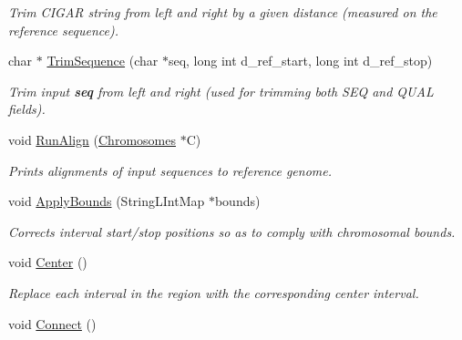 \begin{CompactItemize}
\begin{CompactList}\small\item\em Trim CIGAR string from left and right by a given distance (measured on the reference sequence). \item\end{CompactList}\item 
\hypertarget{classGenomicRegionSAM_0ff4472118291a8034efc929c784680c}{
char $\ast$ \hyperlink{classGenomicRegionSAM_0ff4472118291a8034efc929c784680c}{TrimSequence} (char $\ast$seq, long int d\_\-ref\_\-start, long int d\_\-ref\_\-stop)}
\label{classGenomicRegionSAM_0ff4472118291a8034efc929c784680c}

\begin{CompactList}\small\item\em Trim input {\bf seq} from left and right (used for trimming both SEQ and QUAL fields). \item\end{CompactList}\item 
\hypertarget{classGenomicRegionSAM_97b9fec94e5f21490d839b3f99235a96}{
void \hyperlink{classGenomicRegionSAM_97b9fec94e5f21490d839b3f99235a96}{RunAlign} (\hyperlink{classChromosomes}{Chromosomes} $\ast$C)}
\label{classGenomicRegionSAM_97b9fec94e5f21490d839b3f99235a96}

\begin{CompactList}\small\item\em Prints alignments of input sequences to reference genome. \item\end{CompactList}\item 
\hypertarget{classGenomicRegionSAM_5d82c1d84432274392416f87bfac655a}{
void \hyperlink{classGenomicRegionSAM_5d82c1d84432274392416f87bfac655a}{ApplyBounds} (StringLIntMap $\ast$bounds)}
\label{classGenomicRegionSAM_5d82c1d84432274392416f87bfac655a}

\begin{CompactList}\small\item\em Corrects interval start/stop positions so as to comply with chromosomal bounds. \item\end{CompactList}\item 
\hypertarget{classGenomicRegionSAM_52fa8c0420b16fe92f54427365f72899}{
void \hyperlink{classGenomicRegionSAM_52fa8c0420b16fe92f54427365f72899}{Center} ()}
\label{classGenomicRegionSAM_52fa8c0420b16fe92f54427365f72899}

\begin{CompactList}\small\item\em Replace each interval in the region with the corresponding center interval. \item\end{CompactList}\item 
\hypertarget{classGenomicRegionSAM_d765c84814151be0e710fefb37c7949a}{
void \hyperlink{classGenomicRegionSAM_d765c84814151be0e710fefb37c7949a}{Connect} ()}
\label{classGenomicRegionSAM_d765c84814151be0e710fefb37c7949a}


\end{CompactItemize}
